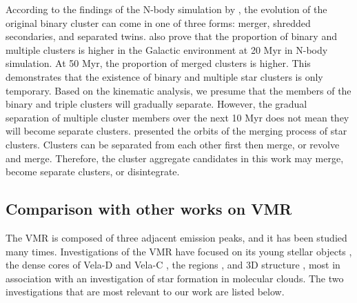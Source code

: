 \documentclass{aa} %
\begin{document}
 

According to the findings of the N-body simulation by \citet{2010ApJ...719..104D}, 
the evolution of the original binary cluster can come in one of three forms: merger, shredded secondaries, and separated twins.
\cite{2021MNRAS.506.4603D} also prove that the proportion of binary and multiple clusters is higher in the Galactic environment at 20 Myr in N-body simulation. At 50 Myr, the proportion of merged clusters is higher. This demonstrates that the existence of binary and multiple star clusters is only temporary. Based on the kinematic analysis, we presume that the members of the binary and triple clusters will gradually separate. 
However, the gradual separation 
of multiple cluster members over the next 10 Myr does not mean they will become separate clusters.
\cite{2016MNRAS.457.1339P} presented the orbits of the merging process of star clusters. Clusters can 
be separated from each other first then merge, or revolve and merge. Therefore, the cluster aggregate candidates in this work may merge, 
become separate clusters, or disintegrate.
 

\subsection{Comparison with other works on VMR} \label{sec:cluster}

The VMR is composed of three adjacent emission peaks, and it has been studied many times.
Investigations of the VMR have focused on its young stellar objects \citep{1994A&AS..104..233P}, the dense cores of Vela-D and Vela-C \citep{2010ApJ...723.1065O,2019A&A...628A.110M}, the {} regions \citep{2018A&A...617A..63P}, and 3D structure
\citep{2021A&A...655A..68H}, most in association with an investigation of star formation 
in molecular clouds. The two investigations that are most relevant to our work are listed below. 
\end{document}
